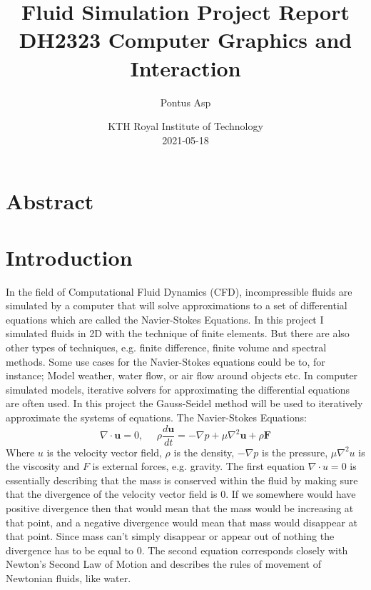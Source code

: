 \documentclass{article}
\title{%
\textbf{Fluid Simulation Project Report}\\%
\large DH2323 Computer Graphics and Interaction}
\author{Pontus Asp}
\date{%
KTH Royal Institute of Technology\\%
2021-05-18}
\begin{document}
\maketitle
\begin{multicols}{2}

\section*{Abstract}
\section{Introduction}
In the field of Computational Fluid Dynamics (CFD), incompressible fluids are simulated by a computer that will solve approximations to a set of differential equations which are called the Navier-Stokes Equations. In this project I simulated fluids in 2D with the technique of finite elements. But there are also other types of techniques, e.g. finite difference, finite volume and spectral methods. Some use cases for the Navier-Stokes equations could be to, for instance; Model weather, water flow, or air flow around objects etc. In computer simulated models, iterative solvers for approximating the differential equations are often used. In this project the Gauss-Seidel method will be used to iteratively approximate the systems of equations. The Navier-Stokes Equations:
\[
    \nabla \cdot \bm{u}=0,~~~~~~
    \rho\frac{d\bm{u}}{dt}=-\nabla p+\mu\nabla^2\bm{u}+\rho \bm{F}
\]
Where $u$ is the velocity vector field, $\rho$ is the density, $-\nabla p$ is the pressure, $\mu \nabla^2u$ is the viscosity and $F$ is external forces, e.g. gravity. The first equation $\nabla \cdot u=0$ is essentially describing that the mass is conserved within the fluid by making sure that the divergence of the velocity vector field is $0$. If we somewhere would have positive divergence then that would mean that the mass would be increasing at that point, and a negative divergence would mean that mass would disappear at that point. Since mass can't simply disappear or appear out of nothing the divergence has to be equal to $0$. The second equation corresponds closely with Newton's Second Law of Motion and describes the rules of movement of Newtonian fluids, like water.


\end{multicols}
\end{document}

